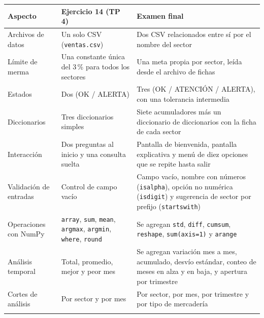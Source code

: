 \documentclass[12pt]{article}
\newcommand{\codigo}[1]{\texttt{\small #1}}
\begin{document}
\begin{center}
\small
\begin{longtable}{p{4.2cm} p{4.6cm} p{5.2cm}}
    \toprule
    \textbf{Aspecto} & \textbf{Ejercicio 14 (TP 4)} & \textbf{Examen final} \\
    \midrule
    \endhead

    Archivos de datos & Un solo CSV (\codigo{ventas.csv}) & Dos CSV relacionados entre sí por el nombre del sector \\
    \addlinespace

    Límite de merma & Una constante única del 3\,\% para todos los sectores & Una meta propia por sector, leída desde el archivo de fichas \\
    \addlinespace

    Estados & Dos (OK / ALERTA) & Tres (OK / ATENCIÓN / ALERTA), con una tolerancia intermedia \\
    \addlinespace

    Diccionarios & Tres diccionarios simples & Siete acumuladores más un diccionario de diccionarios con la ficha de cada sector \\
    \addlinespace

    Interacción & Dos preguntas al inicio y una consulta suelta & Pantalla de bienvenida, pantalla explicativa y menú de diez opciones que se repite hasta salir \\
    \addlinespace

    Validación de entradas & Control de campo vacío & Campo vacío, nombre con números (\codigo{isalpha}), opción no numérica (\codigo{isdigit}) y sugerencia de sector por prefijo (\codigo{startswith}) \\
    \addlinespace

    Operaciones con NumPy & \codigo{array}, \codigo{sum}, \codigo{mean}, \codigo{argmax}, \codigo{argmin}, \codigo{where}, \codigo{round} & Se agregan \codigo{std}, \codigo{diff}, \codigo{cumsum}, \codigo{reshape}, \codigo{sum(axis=1)} y \codigo{arange} \\
    \addlinespace

    Análisis temporal & Total, promedio, mejor y peor mes & Se agregan variación mes a mes, acumulado, desvío estándar, conteo de meses en alza y en baja, y apertura por trimestre \\
    \addlinespace

    Cortes de análisis & Por sector y por mes & Por sector, por mes, por trimestre y por tipo de mercadería \\
    \addlinespace


\end{longtable}
\end{center}
\end{document}
